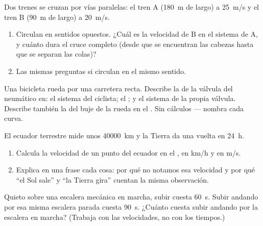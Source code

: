 \begin{exercise}[$\star\star$]\label{exo:g10:relative-motion:8}
Dos trenes se cruzan por vías paralelas: el tren A (\qty{180}{m} de
largo) a \qty{25}{m/s} y el tren B (\qty{90}{m} de largo) a
\qty{20}{m/s}.
\begin{enumerate}
  \item Circulan en sentidos opuestos. ¿Cuál es la velocidad de B en el
        sistema de A, y cuánto dura el cruce completo (desde que se
        encuentran las cabezas hasta que se separan las colas)?
  \item Las mismas preguntas si circulan en el mismo sentido.
\end{enumerate}
\end{exercise}

\begin{exercise}[$\star\star$]\label{exo:g10:relative-motion:9}
Una bicicleta rueda por una carretera recta. Describe la  de
la válvula del neumático en: el sistema del ciclista; el ; y el sistema de la propia válvula. Describe también la
 del buje de la rueda en el . Sin cálculos
--- nombra cada curva.
\end{exercise}

\begin{exercise}[$\star\star$]\label{exo:g10:relative-motion:10}
El ecuador terrestre mide unos \qty{40000}{km} y la Tierra da una vuelta
en \qty{24}{h}.
\begin{enumerate}
  \item Calcula la velocidad de un punto del ecuador en el , en \unit{km/h} y en \unit{m/s}.
  \item Explica en una frase cada cosa: por qué no notamos esa velocidad
        y por qué ``el Sol sale'' y ``la Tierra gira'' cuentan la misma
        observación.
\end{enumerate}
\end{exercise}

\begin{exercise}[$\star\star$]\label{exo:g10:relative-motion:11}
Quieto sobre una escalera mecánica en marcha, subir cuesta \qty{60}{s}.
Subir andando por esa misma escalera parada cuesta \qty{90}{s}. ¿Cuánto
cuesta subir andando por la escalera en marcha? (Trabaja con las
velocidades, no con los tiempos.)
\end{exercise}

